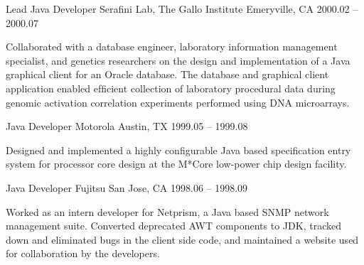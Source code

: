 \begin{cventries}
  \cventry
    {Lead Java Developer}
    {Serafini Lab, The Gallo Institute}
    {Emeryville, CA}
    {2000.02 -- 2000.07}
    {
      \begin{cvitems}
        Collaborated with a database engineer, laboratory information management specialist, and genetics researchers on the design and implementation of a Java graphical client for an Oracle database. The database and graphical client application enabled efﬁcient collection of laboratory procedural data during genomic activation correlation experiments performed using DNA microarrays.
      \end{cvitems}
    }
  \cventry
    {Java Developer}
    {Motorola}
    {Austin, TX}
    {1999.05 -- 1999.08}
    {
      \begin{cvitems}
        Designed and implemented a highly conﬁgurable Java based speciﬁcation entry system for processor core design at the M*Core low-power chip design facility.
      \end{cvitems}
    }
  \cventry
    {Java Developer}
    {Fujitsu}
    {San Jose, CA}
    {1998.06 -- 1998.09}
    {
      \begin{cvitems}
        Worked as an intern developer for Netprism, a Java based SNMP network management suite.  Converted deprecated AWT components to JDK, tracked down and eliminated bugs in the client side code, and maintained a website used for collaboration by the developers.
      \end{cvitems}
    }
\end{cventries}
